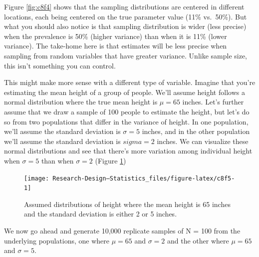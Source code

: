 \documentclass[
]{book}
\begin{document}
Figure \ref{fig:c8f4} shows that the sampling distributions are centered in different locations, each being centered on the true parameter value (11\% vs.~50\%). But what you should also notice is that sampling distribution is wider (less precise) when the prevalence is 50\% (higher variance) than when it is 11\% (lower variance). The take-home here is that estimates will be less precise when sampling from random variables that have greater variance. Unlike sample size, this isn't something you can control.

This might make more sense with a different type of variable. Imagine that you're estimating the mean height of a group of people. We'll assume height follows a normal distribution where the true mean height is \(\mu = 65\) inches. Let's further assume that we draw a sample of 100 people to estimate the height, but let's do so from two populations that differ in the variance of height. In one population, we'll assume the standard deviation is \(\sigma = 5\) inches, and in the other population we'll assume the standard deviation is \(sigma = 2\) inches. We can visualize these normal distributions and see that there's more variation among individual height when \(\sigma = 5\) than when \(\sigma = 2\) (Figure \ref{fig:c8f5})

\begin{figure}

{\centering \texttt{[image: Research-Design---Statistics\_files/figure-latex/c8f5-1]} 

}

\caption{Assumed distributions of height where the mean height is 65 inches and the standard deviation is either 2 or 5 inches.}\label{fig:c8f5}
\end{figure}

We now go ahead and generate 10,000 replicate samples of N = 100 from the underlying populations, one where \(\mu=65\) and \(\sigma=2\) and the other where \(\mu=65\) and \(\sigma=5\).
\end{document}
